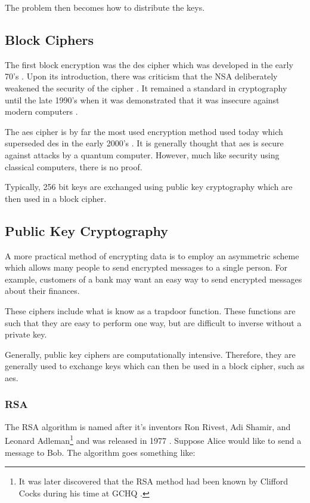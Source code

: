 The problem then becomes how to distribute the keys.

\subsection{Block Ciphers}

The first block encryption was the \ac{des} cipher which was developed in the early 70's \cite{}. Upon its introduction, there was criticism that the NSA deliberately weakened the security of the cipher \cite{Diffie1977}. It remained a standard in cryptography until the late 1990's when it was demonstrated that it was insecure against modern computers \cite{}.

The \ac{aes} cipher is by far the most used encryption method used today which superseded \ac{des} in the early 2000's \cite{}. It is generally thought that \ac{aes} is secure against attacks by a quantum computer. However, much like security using classical computers, there is no proof.

Typically, 256 bit keys are exchanged using public key cryptography which are then used in a block cipher. 

\subsection{Public Key Cryptography}

A more practical method of encrypting data is to employ an asymmetric scheme which allows many people to send encrypted messages to a single person. For example, customers of a bank may want an easy way to send encrypted messages about their finances.

These ciphers include what is know as a {\color{bristol-red} trapdoor function}. These functions are such that they are easy to perform one way, but are difficult to inverse without a private key. 

Generally, public key ciphers are computationally intensive. Therefore, they are generally used to exchange keys which can then be used in a block cipher, such as \ac{aes}.

\subsubsection*{RSA}

The RSA algorithm is named after it's inventors Ron Rivest, Adi Shamir, and Leonard Adleman\footnote{It was later discovered that the RSA method had been known by Clifford Cocks during his time at GCHQ \cite{}.} and was released in 1977 \cite{}. Suppose Alice would like to send a message to Bob. The algorithm goes something like:

